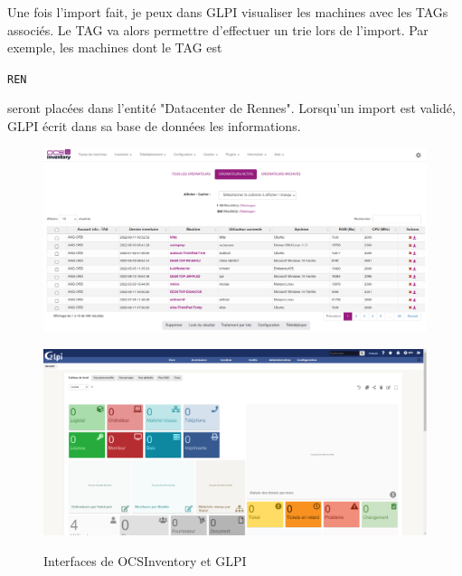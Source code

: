 \documentclass[12pt]{article}
\begin{document}
Une fois l'import fait, je peux dans \gls{GLPI} visualiser les machines avec les TAGs associés. 
Le TAG va alors permettre d'effectuer un trie lors de l'import. 
Par exemple, les machines dont le TAG est \begin{code}\texttt{REN}\end{code} seront placées dans l'entité "Datacenter de Rennes".
Lorsqu'un import est validé, \gls{GLPI} écrit dans sa base de données les informations. \\

\begin{figure}[ht!]
\noindent%
\begin{minipage}{.5\textwidth}%
\begin{center}
\includegraphics[width=\textwidth]{src/interface_ocsinventory.png} \\
\end{center}
\end{minipage}%
\hfill
\begin{minipage}{.5\textwidth}%
\begin{center}
\includegraphics[width=\textwidth]{src/interface_glpi.png} \\
\end{center}
\end{minipage}%
    \caption{Interfaces de \gls{OCSInventory} et \gls{GLPI}}
\end{figure}
\end{document}

